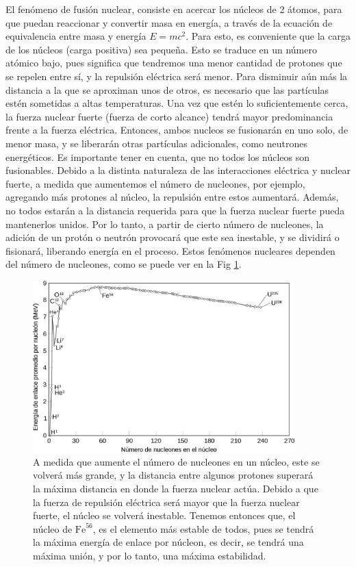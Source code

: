 \documentclass[../main.tex]{subfiles}
\begin{document}
    
    
    
    El fenómeno de fusión nuclear, consiste en acercar los núcleos de 2 átomos, para que puedan reaccionar y convertir masa en energía, a través de la ecuación de equivalencia entre masa y energía $E=mc^2$. Para esto, es conveniente que la carga de los núcleos (carga positiva) sea pequeña. Esto se traduce en un número atómico bajo, pues significa que tendremos una menor cantidad de protones que se repelen entre sí, y la repulsión eléctrica será menor. Para disminuir aún más la distancia a la que se aproximan unos de otros, es necesario que las partículas estén sometidas a altas temperaturas. Una vez que estén lo suficientemente cerca, la fuerza nuclear fuerte (fuerza de corto alcance) tendrá 
    mayor predominancia frente a la fuerza eléctrica. Entonces, ambos nucleos se fusionarán en uno solo, de menor masa, y se liberarán otras partículas adicionales, como neutrones energéticos. Es importante tener en cuenta, que no todos los núcleos son fusionables. Debido a la distinta naturaleza de las interacciones eléctrica y nuclear fuerte, a medida que aumentemos el número de nucleones, por ejemplo, agregando más protones al núcleo, la repulsión entre estos aumentará. Además, no todos estarán a la distancia requerida para que la fuerza nuclear fuerte pueda mantenerlos unidos. Por lo tanto, a partir de cierto número de nucleones, la adición de un protón o neutrón provocará que este sea inestable, y se dividirá o fisionará, liberando energía en el proceso. Estos fenómenos nucleares dependen del número de nucleones, como se puede ver en la Fig \ref{fig: fusion_fision}.
    
     \begin{figure}[h]
        \centering
        \includegraphics[width=0.9\textwidth]{Images/energia_de_enlace.jpg}
        \caption{A medida que aumente el número de nucleones en un núcleo, este se volverá más grande, y la distancia entre algunos protones superará la máxima distancia en donde la fuerza nuclear actúa. Debido a que la fuerza de repulsión eléctrica será mayor que la fuerza nuclear fuerte, el núcleo se volverá inestable. Tenemos entonces que, el núcleo de $\mathrm{Fe}^{56}$, es el elemento más estable de todos, pues se tendrá la máxima energía de enlace por núcleon, es decir, se tendrá una máxima unión, y por lo tanto, una máxima estabilidad.}
        \label{fig: fusion_fision}
    \end{figure}
\end{document}
